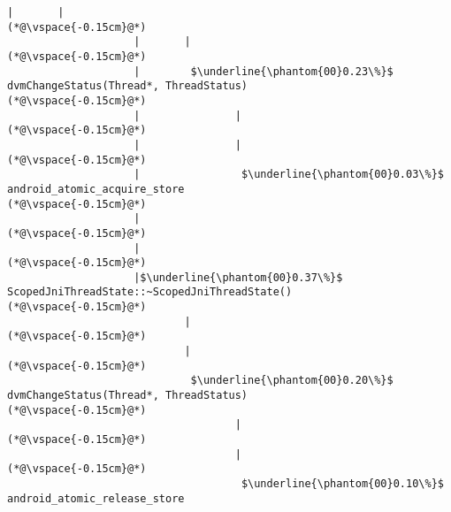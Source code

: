 \begin{lstlisting}[caption=Metodikutsu C$\to$Java 20 viiteparametrilla, label=profile:C2JBenchmark00206, numberbychapter=true, frame=lines, float, floatplacement=t]
                    |       |
(*@\vspace{-0.15cm}@*)
                    |       |
(*@\vspace{-0.15cm}@*)
                    |        $\underline{\phantom{00}0.23\%}$ dvmChangeStatus(Thread*, ThreadStatus)
(*@\vspace{-0.15cm}@*)
                    |               |
(*@\vspace{-0.15cm}@*)
                    |               |
(*@\vspace{-0.15cm}@*)
                    |                $\underline{\phantom{00}0.03\%}$ android_atomic_acquire_store
(*@\vspace{-0.15cm}@*)
                    |
(*@\vspace{-0.15cm}@*)
                    |
(*@\vspace{-0.15cm}@*)
                    |$\underline{\phantom{00}0.37\%}$ ScopedJniThreadState::~ScopedJniThreadState()
(*@\vspace{-0.15cm}@*)
                            |
(*@\vspace{-0.15cm}@*)
                            |
(*@\vspace{-0.15cm}@*)
                             $\underline{\phantom{00}0.20\%}$ dvmChangeStatus(Thread*, ThreadStatus)
(*@\vspace{-0.15cm}@*)
                                    |
(*@\vspace{-0.15cm}@*)
                                    |
(*@\vspace{-0.15cm}@*)
                                     $\underline{\phantom{00}0.10\%}$ android_atomic_release_store

\end{lstlisting}

